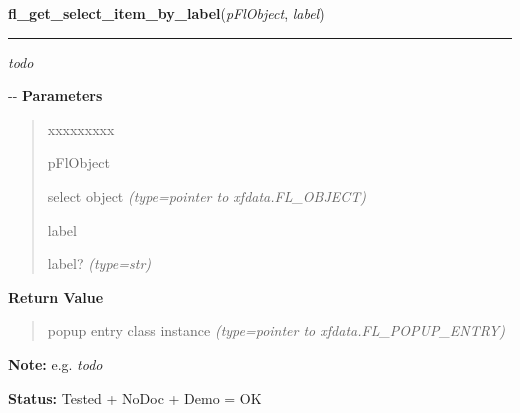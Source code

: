\hspace{.8\funcindent}\begin{boxedminipage}{\funcwidth}

    \raggedright \textbf{fl\_get\_select\_item\_by\_label}(\textit{pFlObject}, \textit{label})

    \vspace{-1.5ex}

    \rule{\textwidth}{0.5\fboxrule}
\setlength{\parskip}{2ex}

\emph{todo}

-{}-
\setlength{\parskip}{1ex}
      \textbf{Parameters}
      \vspace{-1ex}

      \begin{quote}
        \begin{Ventry}{xxxxxxxxx}

          \item[pFlObject]


select object
            {\it (type=pointer to xfdata.FL\_OBJECT)}

          \item[label]


label?
            {\it (type=str)}

        \end{Ventry}

      \end{quote}

      \textbf{Return Value}
    \vspace{-1ex}

      \begin{quote}

popup entry class instance
      {\it (type=pointer to xfdata.FL\_POPUP\_ENTRY)}

      \end{quote}

\textbf{Note:} 
e.g. \emph{todo}


\textbf{Status:} 
Tested + NoDoc + Demo = OK


    \end{boxedminipage}

    \label{xformslib:flselect:fl_get_select_item_by_text}

    \vspace{0.5ex}

